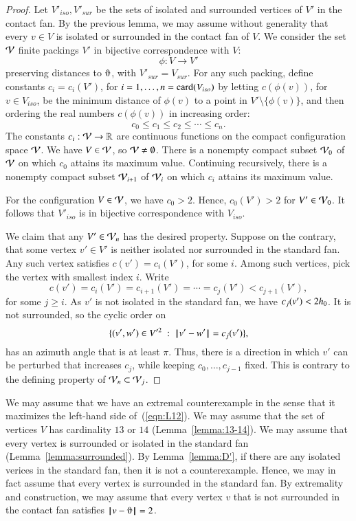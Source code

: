 \begin{proof}  
Let $V'_{iso},V'_{sur}$ be the
sets of isolated and surrounded vertices of $V'$ in the contact
fan.
By the previous lemma, we may assume
without generality that every $v\in V$ is isolated
or surrounded in the contact fan of $V$.    
We consider the set ${\mathcal V}$ finite
packings $V'$ in bijective correspondence with $V$:
$$
\phi:V\to V'
$$
preserving distances to $\orgn$, with $V'_{sur}=V_{sur}$.
For any such packing, define constants $c_i=c_i(V')$,
for $i=1,\ldots,n={\operatorname{card}}(V_{iso})$ by letting 
$c(\phi(v))$, for $v\in V_{iso}$, 
be the minimum distance of $\phi(v)$ to a point
in $V'\setminus \{\phi(v)\}$, and then ordering the real numbers $c(\phi(v))$ in increasing order:
$$
c_0 \le c_1 \le c_2 \le \cdots \le c_n.
$$
The constants $c_i:{\mathcal V}\to\mathbb{R}$ are continuous functions on the compact configuration space ${\mathcal V}$.
We have $V\in {\mathcal V}$, so ${\mathcal V}\ne\emptyset$.
There is a nonempty 
compact subset ${\mathcal V}_0$ of ${\mathcal V}$ on which
$c_0$ attains its maximum value. Continuing recursively,
there is a nonempty compact subset ${\mathcal V}_{i+1}$ of
${\mathcal V}_{i}$ on which $c_i$ attains its maximum value.

For the configuration $V\in {\mathcal V}$, we have $c_0 >2$.
Hence, $c_0(V')>2$ for $V'\in{\mathcal V}_0$.  It follows
that $V'_{iso}$ is in bijective correspondence with
$V_{iso}$.

We claim that any $V'\in {\mathcal V}_n$ has the desired property.
Suppose on the contrary, that some vertex $v'\in V'$
is neither isolated nor surrounded in the standard fan.  
Any such vertex satisfies $c(v')=c_i(V')$, for some $i$.
Among such vertices, pick the vertex with smallest index
$i$.  Write 
$$
c(v') = c_i(V') = c_{i+1}(V') =\cdots= c_j(V') < c_{j+1}(V'),
$$
for some $j\ge i$.  As $v'$ is not isolated in the
standard fan, we have $c_j(v') < 2{h_0}$.  It is not surrounded,
so the cyclic order on
$$
\{(v',w')\in V'^2 \ :\  {\hskip0.1em|\hskip-0.15em|\hskip0.1em}v' - w'{\hskip0.1em|\hskip-0.15em|\hskip0.1em} = c_j(v')\},
$$
has an azimuth angle that is at least $\pi$.
Thus, there is a direction in which $v'$ can be perturbed
that increases $c_j$, while keeping $c_0,\ldots,c_{j-1}$
fixed.  This is contrary to the defining property of
${\mathcal V}_n\subset{\mathcal V}_j$.
\end{proof}


We may assume that we have an extremal counterexample in the sense that it maximizes the left-hand side of~(\ref{eqn:L12}).  We may assume that the set of vertices $V$ has cardinality $13$ or $14$ (Lemma~\ref{lemma:13-14}). We may assume that every vertex is surrounded or isolated in the standard fan (Lemma~\ref{lemma:surrounded}).  By Lemma~\ref{lemma:D'}, if there are any isolated verices in the standard fan, then it is not a counterexample.  Hence, we may in fact assume that every vertex is surrounded in the standard fan. By extremality and construction, we may assume that every vertex $v$ that is not surrounded in the contact fan satisfies $\norm{v}{\orgn}=2$.



